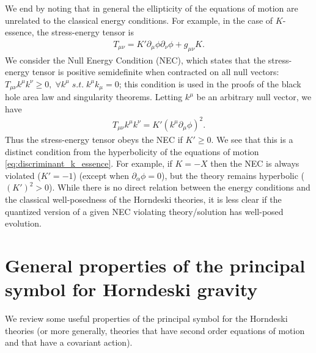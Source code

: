 \documentclass{ws-ijmpd}
\begin{document}
We end by noting that in general the ellipticity of the equations
of motion are unrelated to the classical energy conditions. 
For example, in the case of $K$-essence,
the stress-energy tensor is
\begin{align}
   T_{\mu\nu}
   =
   K'\partial_{\mu}\phi\partial_{\nu}\phi
   +
   g_{\mu\nu}
   K
   .
\end{align}
We consider the Null Energy Condition (NEC), which
states that the stress-energy tensor is positive semidefinite
when contracted on all null vectors:
$T_{\mu\nu}k^{\mu}k^{\nu}\geq0,\;\forall k^{\mu} \; s.t. \; k^{\mu}k_{\mu}=0$; 
this condition is used in the proofs of the black hole
area law and singularity theorems\cite{hawking_ellis_1973}.
Letting $k^{\mu}$ be an arbitrary null vector, we have
\begin{align}
   T_{\mu\nu}k^{\mu}k^{\nu}
   =
   K' \left(k^{\mu}\partial_{\mu}\phi\right)^2
   .
\end{align}
Thus the stress-energy tensor obeys the NEC if $K'\geq0$.
We see that this is a distinct condition from the hyperbolicity
of the equations of motion \eqref{eq:discriminant_k_essence}.
For example, if $K=-X$ then the NEC is always violated ($K'=-1$)
(except when $\partial_{\alpha}\phi=0$), but the theory
remains hyperbolic ($\left(K'\right)^2>0$).
While there is no direct relation between the energy
conditions and the classical well-posedness of the Horndeski theories,
it is less clear if the quantized version of
a given NEC violating theory/solution has well-posed evolution. 

\section{General properties of the principal symbol for Horndeski gravity
   \label{sec:general_properties_principal_symbol}
}
We review some useful properties of the 
principal symbol for the Horndeski theories (or more generally,
theories that have second order equations of motion and that have
a covariant action\cite{Papallo:2017qvl,Kovacs:2020ywu,Reall:2021voz}).
\end{document}
